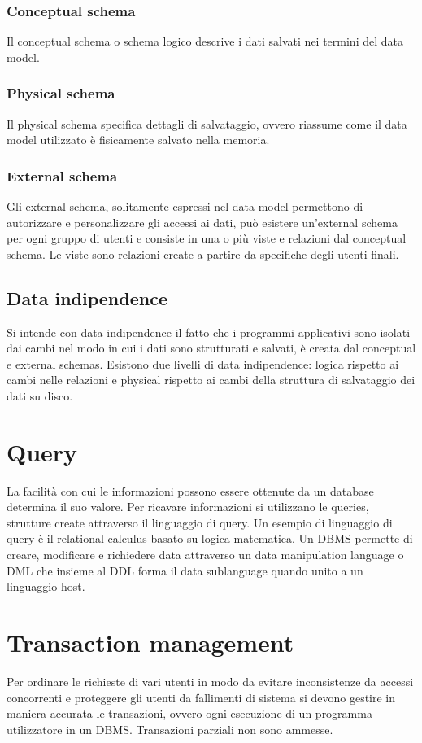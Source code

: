 \subsubsection{Conceptual schema}
Il conceptual schema o schema logico descrive i dati salvati nei termini del data model. 
\subsubsection{Physical schema}
Il physical schema specifica dettagli di salvataggio, ovvero riassume come il data model utilizzato \`e fisicamente salvato nella memoria. 
\subsubsection{External schema}
Gli external schema, solitamente espressi nel data model permettono di autorizzare e personalizzare gli accessi ai dati, pu\`o esistere un'external schema per ogni gruppo di utenti e consiste in una o pi\`u viste e 
relazioni dal conceptual schema. Le viste sono relazioni create a partire da specifiche degli utenti finali. 
\subsection{Data indipendence}
Si intende con data indipendence il fatto che i programmi applicativi sono isolati dai cambi nel modo in cui i dati sono strutturati e salvati, \`e creata dal conceptual e external schemas.  Esistono due livelli di data 
indipendence: logica rispetto ai cambi nelle relazioni e physical rispetto ai cambi della struttura di salvataggio dei dati su disco. 
\section{Query}
La facilit\`a con cui le informazioni possono essere ottenute da un database determina il suo valore. Per ricavare informazioni si utilizzano le queries, strutture create attraverso il linguaggio di query. Un 
esempio di linguaggio di query \`e il relational calculus basato su logica matematica. Un DBMS permette di creare, modificare e richiedere data attraverso un data manipulation language o DML che insieme al 
DDL forma il data sublanguage quando unito a un linguaggio host.
\section{Transaction management}
Per ordinare le richieste di vari utenti in modo da evitare inconsistenze da accessi concorrenti e proteggere gli utenti da fallimenti di sistema si devono gestire in maniera accurata le transazioni, ovvero ogni 
esecuzione di un programma utilizzatore in un DBMS. Transazioni parziali non sono ammesse. 
